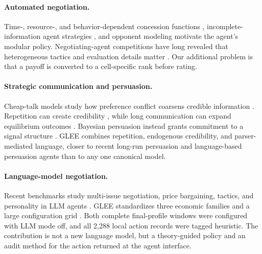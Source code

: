 \paragraph{Automated negotiation.}
Time-, resource-, and behavior-dependent concession functions
\citep{faratin1998negotiation}, incomplete-information agent strategies
\citep{fatima2002optimal}, and opponent modeling
\citep{jennings2001automated,baarslag2016opponent} motivate the agent's modular
policy. Negotiating-agent competitions have long revealed that heterogeneous
tactics and evaluation details matter \citep{baarslag2013anac}. Our additional
problem is that a payoff is converted to a cell-specific rank before rating.

\paragraph{Strategic communication and persuasion.}
Cheap-talk models study how preference conflict coarsens credible information
\citep{crawford1982strategic,farrell1996cheap}. Repetition can create credibility
\citep{sobel1985credibility}, while long communication can expand equilibrium
outcomes \citep{aumann2003long}. Bayesian persuasion instead grants
commitment to a signal structure \citep{kamenica2011bayesian}. GLEE combines
repetition, endogenous credibility, and parser-mediated language, closer to
recent long-run persuasion and language-based persuasion agents
\citep{best2024longrun,apel2022predicting,raifer2022automatic} than to any one
canonical model.

\paragraph{Language-model negotiation.}
Recent benchmarks study multi-issue negotiation, price bargaining, tactics,
and personality in LLM agents
\citep{abdelnabi2023negotiation,bianchi2024arena,xia2024bargaining}. GLEE
standardizes three economic families and a large configuration grid
\citep{shapira2024glee}. Both complete final-profile windows were configured
with LLM mode off, and all 2,288 local action records were tagged heuristic.
The contribution is not a new language model, but a theory-guided policy and an
audit method for the action returned at the agent interface.

